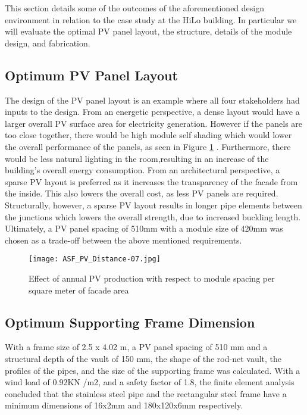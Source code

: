 

This section details some of the outcomes of the aforementioned design environment in relation to the case study at the HiLo building. In particular we will evaluate the optimal PV panel layout, the structure, details of the module design, and fabrication.

\subsection{Optimum PV Panel Layout}
The design of the PV panel layout is an example where all four stakeholders had inputs to the design. From an energetic perspective, a dense layout would have a larger overall PV surface area for electricity generation. However if the panels are too close together, there would be high module self shading which would lower the overall performance of the panels, as seen in Figure \ref{fig:spacing} \cite{hofer2016parametric}. Furthermore, there would be less natural lighting in the room,resulting in an increase of the building's overall  energy consumption. From an architectural perspective, a sparse PV layout is preferred as it increases the transparency of the facade from the inside. This also lowers the overall cost, as less PV panels are required. Structurally, however, a sparse PV layout results in longer pipe elements between the junctions which lowers the overall strength, due to increased buckling length. Ultimately, a PV panel spacing of 510mm with a module size of 420mm was chosen as a trade-off between the above mentioned requirements. 

\begin{figure}
\begin{center}
\texttt{[image: ASF\_PV\_Distance-07.jpg]}
\caption{Effect of annual PV production with respect to module spacing per square meter of facade area \cite{hofer2016parametric}}
\label{fig:spacing}
\end{center}
\end{figure}

\subsection{Optimum Supporting Frame Dimension}
\label{ch:structure}


With a frame size of 2.5 x 4.02 m, a PV panel spacing of 510 mm and a structural depth of the vault of 150 mm, the shape of the rod-net vault, the profiles  of the pipes, and the size of the supporting frame was calculated. With a wind load of 0.92KN /m2, and a safety factor of 1.8, the finite element analysis concluded that the stainless steel pipe and the rectangular steel frame have a minimum dimensions of 16x2mm and 180x120x6mm respectively. 

